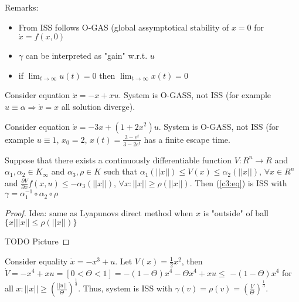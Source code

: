 Remarks:

\begin{itemize}
 \item From ISS follows O-GAS (global assymptotical stability of $x=0$ for
   $\dot x=f(x,0)$
 \item $\gamma$ can be interpreted as "gain" w.r.t. $u$
 \item if $\lim_{t\to\infty} u(t)=0$ then $\lim_{t \to\infty}x(t)=0$
\end{itemize}

\begin{Example}
 Consider equation $\dot x = -x+xu$. System is O-GASS, not ISS (for example
 $u\equiv\alpha \Rightarrow \dot x = x$ all solution diverge).
\end{Example}

\begin{Example}
 Consider equation $\dot x =-3x+(1+2x^2)u$. System is O-GASS, not ISS (for example 
 $u\equiv1$, $x_0=2$, $x(t)=\frac{3-e^{t}}{3-2e^{t}}$ has a finite escape time.
\end{Example}

\begin{Theorem}
 Suppose that there exists a continuously differentiable function 
 $V:R^n\to R$ and $\alpha_1,\alpha_2\in K_\infty$ and $\alpha_3, \rho \in K$
 such that $\alpha_1(||x||)\le V(x)\le\alpha_2(||x||)$, $\forall x\in R^n$ and
 $\frac{\partial V}{\partial x}f(x,u)\le-\alpha_3(||x||)$,
 $\forall x: ||x||\ge\rho(||x||)$. Then (\ref{c3:eq}) is ISS with 
 $\gamma = \alpha_1^{-1} \circ \alpha_2\circ\rho$

 \begin{proof}
 Idea: same as Lyapunovs direct method when $x$ is "outside" of ball
 $\{x | ||x||\le\rho(||x||)\}$

 TODO Picture
 \end{proof}
\end{Theorem}


\begin{Example}
 Consider equality $\dot x = -x^3+u$. Let $V(x)=\frac{1}{2}x^2$, then
 $\dot V = -x^4+xu=[0<\Theta<1]=-(1-\Theta)x^4-\Theta x^4+xu\le$
 $-(1-\Theta)x^4$ for all $x: ||x||\ge\left(\frac{||u||}{\Theta}\right)^\frac{1}{3}$.
 Thus, system is ISS with 
 $\gamma(v)=\rho(v)=\left(\frac{V}{\Theta}\right)^\frac{1}{3}$.
\end{Example}

